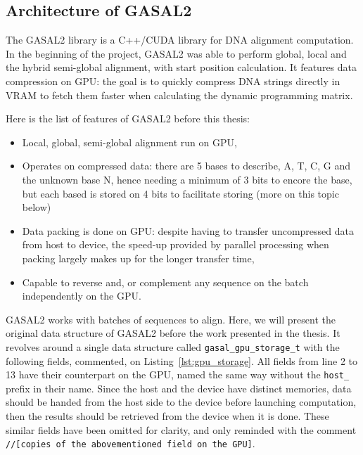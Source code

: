 \subsection{Architecture of GASAL2}
The GASAL2 library is a C++/CUDA library for DNA alignment computation. In the beginning of the project, GASAL2 was able to perform global, local and the hybrid semi-global alignment, with start position calculation. It features data compression on GPU: the goal is to quickly compress DNA strings directly in VRAM to fetch them faster when calculating the dynamic programming matrix.

Here is the list of features of GASAL2 before this thesis:
\begin{itemize}
	\item Local, global, semi-global alignment run on GPU,
	\item Operates on compressed data: there are 5 bases to describe, A, T, C, G and the unknown base N, hence needing a minimum of 3 bits to encore the base, but each based is stored on 4 bits to facilitate storing (more on this topic below)
	\item Data packing is done on GPU: despite having to transfer uncompressed data from host to device, the speed-up provided by parallel processing when packing largely makes up for the longer transfer time,
	\item Capable to reverse and, or complement any sequence on the batch independently on the GPU.
\end{itemize}

GASAL2 works with batches of sequences to align. Here, we will present the original data structure of GASAL2 before the work presented in the thesis. It revolves around a single data structure called \verb|gasal_gpu_storage_t| with the following fields, commented, on Listing~\ref{lst:gpu_storage}. All fields from line 2 to 13 have their counterpart on the GPU, named the same way without the \verb|host_| prefix in their name. Since the host and the device have distinct memories, data should be handed from the host side to the device before launching computation, then the results should be retrieved from the device when it is done.  
These similar fields have been omitted for clarity, and only reminded with the comment \verb|//[copies of the abovementioned field on the GPU]|.

